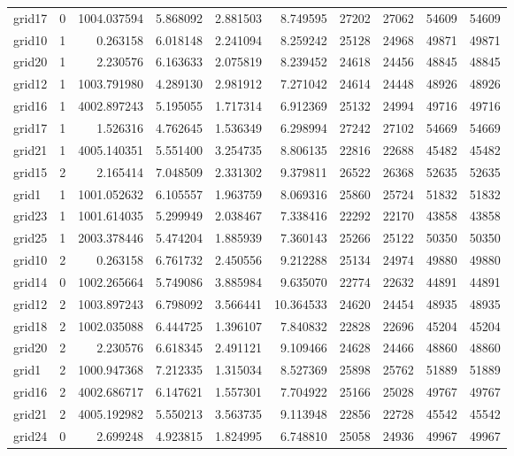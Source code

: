 \begin{longtable}{|l|r|r|r|r|r|r|r|r|r|}
grid17 & 0 & 1004.037594 & 5.868092 & 2.881503 & 8.749595 & 27202 & 27062 & 54609 & 54609 \\
grid10 & 1 & 0.263158 & 6.018148 & 2.241094 & 8.259242 & 25128 & 24968 & 49871 & 49871 \\
grid20 & 1 & 2.230576 & 6.163633 & 2.075819 & 8.239452 & 24618 & 24456 & 48845 & 48845 \\
grid12 & 1 & 1003.791980 & 4.289130 & 2.981912 & 7.271042 & 24614 & 24448 & 48926 & 48926 \\
grid16 & 1 & 4002.897243 & 5.195055 & 1.717314 & 6.912369 & 25132 & 24994 & 49716 & 49716 \\
grid17 & 1 & 1.526316 & 4.762645 & 1.536349 & 6.298994 & 27242 & 27102 & 54669 & 54669 \\
grid21 & 1 & 4005.140351 & 5.551400 & 3.254735 & 8.806135 & 22816 & 22688 & 45482 & 45482 \\
grid15 & 2 & 2.165414 & 7.048509 & 2.331302 & 9.379811 & 26522 & 26368 & 52635 & 52635 \\
grid1 & 1 & 1001.052632 & 6.105557 & 1.963759 & 8.069316 & 25860 & 25724 & 51832 & 51832 \\
grid23 & 1 & 1001.614035 & 5.299949 & 2.038467 & 7.338416 & 22292 & 22170 & 43858 & 43858 \\
grid25 & 1 & 2003.378446 & 5.474204 & 1.885939 & 7.360143 & 25266 & 25122 & 50350 & 50350 \\
grid10 & 2 & 0.263158 & 6.761732 & 2.450556 & 9.212288 & 25134 & 24974 & 49880 & 49880 \\
grid14 & 0 & 1002.265664 & 5.749086 & 3.885984 & 9.635070 & 22774 & 22632 & 44891 & 44891 \\
grid12 & 2 & 1003.897243 & 6.798092 & 3.566441 & 10.364533 & 24620 & 24454 & 48935 & 48935 \\
grid18 & 2 & 1002.035088 & 6.444725 & 1.396107 & 7.840832 & 22828 & 22696 & 45204 & 45204 \\
grid20 & 2 & 2.230576 & 6.618345 & 2.491121 & 9.109466 & 24628 & 24466 & 48860 & 48860 \\
grid1 & 2 & 1000.947368 & 7.212335 & 1.315034 & 8.527369 & 25898 & 25762 & 51889 & 51889 \\
grid16 & 2 & 4002.686717 & 6.147621 & 1.557301 & 7.704922 & 25166 & 25028 & 49767 & 49767 \\
grid21 & 2 & 4005.192982 & 5.550213 & 3.563735 & 9.113948 & 22856 & 22728 & 45542 & 45542 \\
grid24 & 0 & 2.699248 & 4.923815 & 1.824995 & 6.748810 & 25058 & 24936 & 49967 & 49967 \\

\end{longtable}
